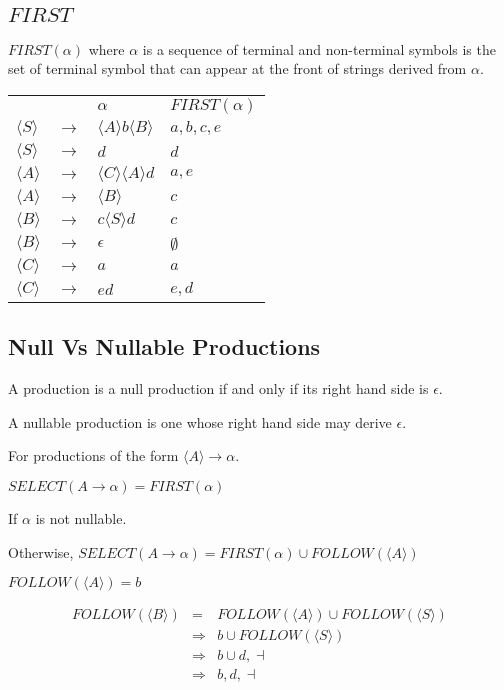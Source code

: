 \documentclass[a4paper,12pt]{article}
\newcommand{\nonterminal}[1]{\langle #1 \rangle}
\begin{document}
\subsection*{$FIRST$}

$FIRST(\alpha)$ where $\alpha$ is a sequence of terminal and
non-terminal symbols is the set of terminal symbol that can appear at the
front of strings derived from $\alpha$.

\begin{tabular}{llll}
						&			&	$\alpha$		&	$FIRST(\alpha)$			\\
$\nonterminal{S}$	&	$\to$	&	$\nonterminal{A} b \nonterminal{B}$		&	${a, b, c, e}$	\\
$\nonterminal{S}$	&	$\to$	&	$d$ 												&	${d}$				\\
$\nonterminal{A}$	&	$\to$	&	$\nonterminal{C} \nonterminal{A} d$		&	${a, e}$			\\
$\nonterminal{A}$	&	$\to$	&	$\nonterminal{B}$								&	${c}$				\\
$\nonterminal{B}$	&	$\to$	&	$c \nonterminal{S} d$						&	${c}$				\\
$\nonterminal{B}$	&	$\to$	&	$\epsilon$										&	${\emptyset}$			\\
$\nonterminal{C}$	&	$\to$	&	$a$												&	${a}$				\\
$\nonterminal{C}$	&	$\to$	&	$ed$												&	${e, d}	$		\\
\end{tabular}

\subsection*{Null Vs Nullable Productions}

A production is a null production if and only if its right hand side is
$\epsilon$.

A nullable production is one whose right hand side may derive
$\epsilon$.

For productions of the form $\nonterminal{A} \to \alpha$.

$SELECT(A \to \alpha) = FIRST(\alpha)$

If $\alpha$ is not nullable.

Otherwise, $SELECT(A \to \alpha) = FIRST(\alpha) \cup	FOLLOW(\nonterminal{A})$

$FOLLOW(\nonterminal{A}) = {b}$

\begin{eqnarray*}
FOLLOW(\nonterminal{B}) &	=	&	FOLLOW(\nonterminal{A}) \cup FOLLOW(\nonterminal{S}) 	\\
				&	\Rightarrow		&	{b} \cup FOLLOW(\nonterminal{S})				\\
				&	\Rightarrow		&	{b} \cup {d, \dashv}					\\
				&	\Rightarrow		&	{b, d, \dashv}										\\
\end{eqnarray*}
\end{document}
